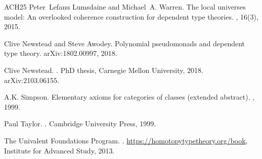 \documentclass[12pt,reqno]{amsart}
\theoremstyle{remark}
\theoremstyle{definition}
\begin{document}
\begin{thebibliography}{ACH{\etalchar{+}}25}
Peter~Lefanu Lumsdaine and Michael~A. Warren.
\newblock The local universes model: An overlooked coherence construction for
  dependent type theories.
, 16(3), 2015.

Clive Newstead and Steve Awodey.
\newblock Polynomial pseudomonads and dependent type theory.
\newblock arXiv:1802.00997, 2018.

Clive Newstead.
.
\newblock Ph{D} thesis, Carnegie Mellon University, 2018.
\newblock arXiv:2103.06155.

A.K. Simpson.
\newblock Elementary axioms for categories of classes (extended abstract).
,
  1999.

Paul Taylor.
.
\newblock Cambridge University Press, 1999.

The {Univalent Foundations Program}.
.
\newblock \url{https://homotopytypetheory.org/book}, Institute for Advanced
  Study, 2013.

\end{thebibliography}


\end{document}
